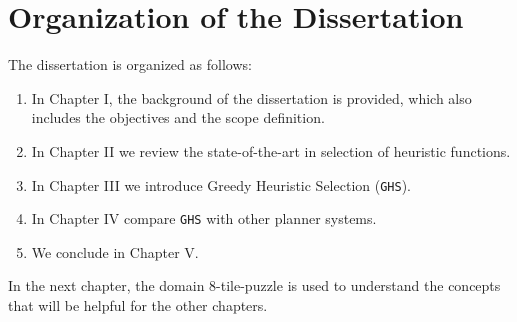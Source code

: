 \section{Organization of the Dissertation}
\noindent
The dissertation is organized as follows: 
\begin{enumerate}
\item In Chapter I, the background of the dissertation is provided, which also includes the objectives and the scope definition.
\item In Chapter II we review the state-of-the-art in selection of heuristic functions.
\item In Chapter III we introduce Greedy Heuristic Selection (\texttt{GHS}). 
\item In Chapter IV compare \texttt{GHS} with other planner systems.
\item We conclude in Chapter V.
\end{enumerate}

In the next chapter, the domain 8-tile-puzzle is used to understand the concepts that will be helpful for the other chapters.

\clearpage